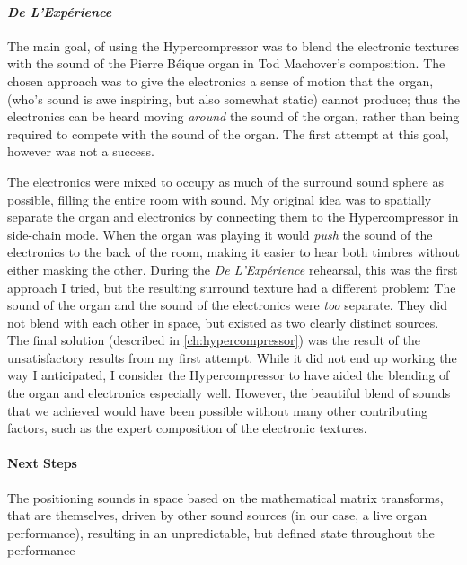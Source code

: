 \paragraph{\textit{De L'Exp\'{e}rience}}
The main goal, of using the Hypercompressor was to blend the
electronic textures with the sound of the Pierre B\'{e}ique organ in
Tod Machover's composition. The chosen approach was to give the
electronics a sense of motion that the organ, (who's sound is awe
inspiring, but also somewhat static) cannot produce; thus the
electronics can be heard moving \emph{around} the sound of the organ,
rather than being required to compete with the sound of the organ.
The first attempt at this goal, however was not a success.

The electronics were mixed to occupy as much of the surround sound
sphere as possible, filling the entire room with sound.  My original
idea was to spatially separate the organ and electronics by connecting
them to the Hypercompressor in side-chain mode.  When the organ was
playing it would \emph{push} the sound of the electronics to the back
of the room, making it easier to hear both timbres without either
masking the other.  During the \textit{De L'Exp\'{e}rience} rehearsal,
this was the first approach I tried, but the resulting surround
texture had a different problem: The sound of the organ and the sound
of the electronics were \emph{too} separate. They did not blend with
each other in space, but existed as two clearly distinct sources. The
final solution (described in \autoref{ch:hypercompressor}) was the
result of the unsatisfactory results from my first attempt. While it
did not end up working the way I anticipated, I consider the
Hypercompressor to have aided the blending of the organ and
electronics especially well. However, the beautiful blend of sounds that
we achieved would have been possible without many other contributing
factors, such as the expert composition of the electronic textures.

\paragraph{Next Steps}The positioning sounds in space based on the
mathematical matrix transforms, that are themselves, driven by other
sound sources (in our case, a live organ performance), resulting in an
unpredictable, but defined state throughout the performance


